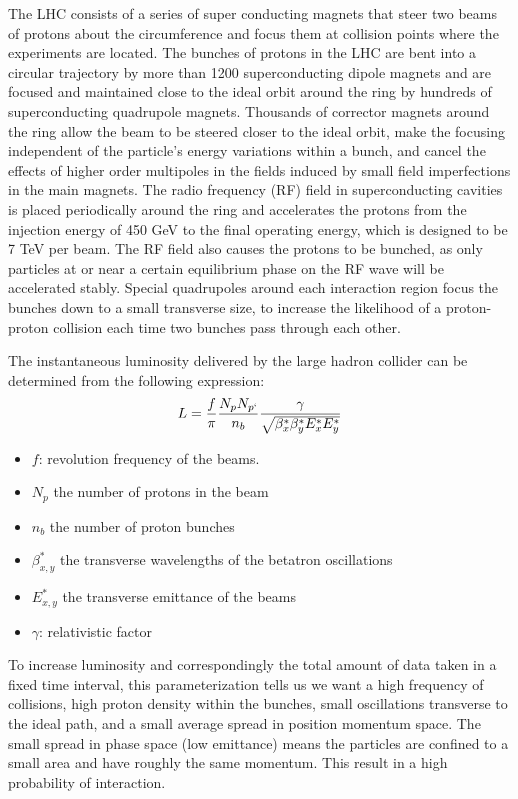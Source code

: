 The LHC consists of a series of super conducting
magnets that steer two beams of protons about the circumference and focus them at collision points where the
experiments are located. The bunches of protons in the LHC are bent into a circular trajectory by more than 1200
 superconducting dipole magnets and are focused and maintained close to the ideal
 orbit around the ring by hundreds of superconducting quadrupole magnets. 
Thousands of corrector magnets around the ring allow the beam to be steered closer 
to the ideal orbit, make the focusing independent of the particle's energy variations
 within a bunch, and cancel the effects of higher order multipoles in the fields induced 
by small field imperfections in the main magnets. 
The radio frequency (RF) field in superconducting cavities is placed periodically around 
the ring and accelerates the protons from the injection energy of 450 GeV to the final
 operating energy, which is designed to be 7 TeV per beam. The RF field also causes the
 protons to be bunched, as only particles at or near a certain equilibrium phase on 
the RF wave will be accelerated stably. Special quadrupoles around each interaction region
 focus the bunches down to a small transverse size, to increase the likelihood of a
 proton-proton collision each time two bunches pass through each other.

The instantaneous luminosity delivered by the large hadron collider
 can be determined from  the following expression:
\begin{equation}
L = \frac{f}{\pi} \frac{N_p N_{p`}}{n_b} \frac{\gamma}{\sqrt{\beta^*_x \beta^*_y E_x^* E_y^*}}
\end{equation}
\begin{itemize}
\item $f$: revolution frequency of the beams. 
\item $N_p$ the number of protons in the beam
\item $n_b$ the number of proton bunches 
\item $\beta^*_{x,y}$ the transverse wavelengths of the betatron oscillations
\item $E_{x,y}^*$ the transverse emittance of the beams
\item $\gamma$: relativistic factor
\end{itemize}
To increase luminosity and correspondingly the total amount of data taken in a fixed time interval,
 this parameterization tells us we want a high frequency of collisions, high proton density within 
the bunches, small oscillations transverse to the ideal path, and a small average
spread in position momentum space. The small spread in phase space (low emittance) 
means the particles are confined to a small area and have roughly the same
 momentum. This result in a high probability of interaction.

